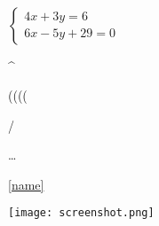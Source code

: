\documentclass[12pt, a4paper, oneside]{report}	%
\begin{document}
\text{}

\begin{eqnarray}
\end{eqnarray}

$\begin{cases}
	4x + 3y = 6\\
	6x - 5y + 29= 0
\end{cases}$



\usepackage{amsfonts}
\usepackage{amssymb}


^\circ

\times

(\big (\Big (\bigg (\Bigg

\usepackage{textcomp}

\newcommand*{\No}{\textnumero}

\No

{\slash}

\ldots


\usepackage{hyperref}

\label{name}

\ref{name}

\makeatletter
\let\ref\@refstar
\makeatother


\usepackage{graphicx}

\texttt{[image: screenshot.png]}


\usepackage{enumerate}
\end{document}
